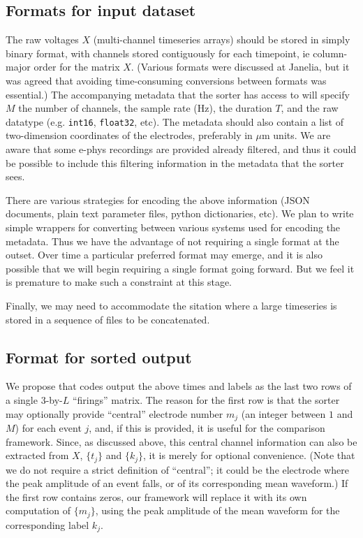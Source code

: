 \documentclass[10pt]{article}
\begin{document}
\subsection{Formats for input dataset}
\label{s:int}

The raw voltages $X$ (multi-channel timeseries arrays) should be stored
in simply binary format,
with channels stored contiguously for each timepoint, ie column-major order
for the matrix $X$.
(Various formats were discussed at Janelia, but it was agreed that
avoiding time-consuming conversions between formats was essential.)
The accompanying metadata that the sorter has access to will
specify $M$ the number of channels, the sample rate (Hz), the duration $T$,
and the raw datatype (e.g. {\tt int16}, {\tt float32}, etc).
The metadata should
also contain a list of two-dimension coordinates of the electrodes,
preferably in $\mu$m units.
We are aware that some e-phys recordings are provided already filtered,
and thus it could be possible to include this filtering information in the
metadata that the sorter sees.

There are various strategies for encoding the above information
(JSON documents, plain text parameter files, python dictionaries, etc). We plan 
to write simple wrappers for converting between various systems used for encoding
the metadata. Thus we have the advantage of not requiring a single format at the
outset. Over time a particular preferred format may emerge, and it is also possible
that we will begin requiring a single format going forward. But we feel it is
premature to make such a constraint at this stage.

Finally, we may need to
accommodate the sitation where a large timeseries is stored in a sequence of
files to be concatenated.

\subsection{Format for sorted output}

We propose that codes output the above times and labels as the last two rows
of a single $3$-by-$L$ ``firings'' matrix.
The reason for the first row is that the sorter may optionally provide
``central'' electrode number $m_j$
(an integer between $1$ and $M$)
for each event $j$, and, if this is provided,
it is useful for the comparison framework.
Since, as discussed above, this central channel information can
also be extracted from $X$, $\{t_j\}$ and $\{k_j\}$, it is merely for optional
convenience. (Note that we do not require a strict definition of ``central'';
it could be the electrode where the peak amplitude of an event falls,
or of its corresponding mean waveform.)
If the first row contains zeros, our framework will replace it with
its own computation of $\{m_j\}$, using the peak amplitude of the mean
waveform for the corresponding label $k_j$.
\end{document}
